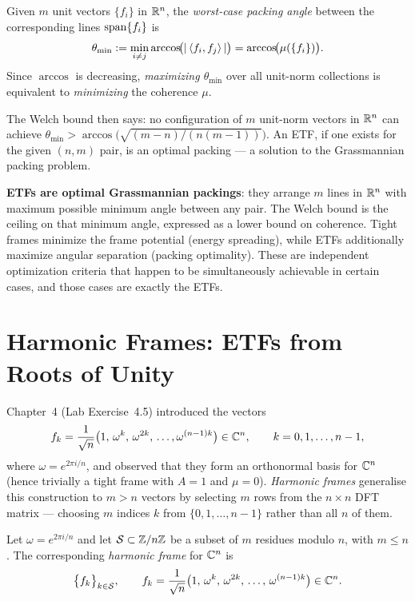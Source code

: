 \begin{definition}
\label{def:packing-angle}
Given $m$ unit vectors $\{f_i\}$ in $\mathbb{R}^n$, the \emph{worst-case
packing angle} between the corresponding lines $\operatorname{span}\{f_i\}$ is
\[
  \theta_{\min} :=
  \min_{i\ne j} \arccos\!\bigl(|\left\langle f_i, f_j \right\rangle|\bigr)
  = \arccos\!\bigl(\mu(\{f_i\})\bigr).
\]
Since $\arccos$ is decreasing, \emph{maximizing $\theta_{\min}$} over
all unit-norm collections is equivalent to \emph{minimizing} the
coherence $\mu$.
\end{definition}

The Welch bound then says: no configuration of $m$ unit-norm vectors in
$\mathbb{R}^n$ can achieve $\theta_{\min}>\arccos\!\bigl(\sqrt{(m-n)/(n(m-1))}\bigr)$.
An ETF, if one exists for the given $(n,m)$ pair, is an optimal packing
--- a solution to the Grassmannian packing problem.

\begin{keyidea}
\textbf{ETFs are optimal Grassmannian packings}: they arrange $m$ lines
in $\mathbb{R}^n$ with maximum possible minimum angle between any pair. The
Welch bound is the ceiling on that minimum angle, expressed as a lower
bound on coherence. Tight frames minimize the frame potential (energy
spreading), while ETFs additionally maximize angular separation (packing
optimality). These are independent optimization criteria that happen to
be simultaneously achievable in certain cases, and those cases are
exactly the ETFs.
\end{keyidea}

\section{Harmonic Frames: ETFs from Roots of Unity}
\label{sec:harmonic-frames}

Chapter~4 (Lab Exercise~4.5) introduced the vectors
\[
  f_k = \frac{1}{\sqrt{n}}\bigl(1,\,\omega^k,\,\omega^{2k},\,\ldots,
  \omega^{(n-1)k}\bigr)\in\mathbb{C}^n, \qquad k=0,1,\ldots,n-1,
\]
where $\omega=e^{2\pi i/n}$, and observed that they form an orthonormal
basis for $\mathbb{C}^n$ (hence trivially a tight frame with $A=1$ and $\mu=0$).
\emph{Harmonic frames} generalise this construction to $m>n$ vectors by
selecting $m$ rows from the $n\times n$ DFT matrix --- choosing
$m$ indices $k$ from $\{0,1,\ldots,n-1\}$ rather than all $n$ of them.

\begin{definition}
\label{def:harmonic-frame}
Let $\omega=e^{2\pi i/n}$ and let $\mathcal{S}\subset\mathbb{Z}/n\mathbb{Z}$ be a
subset of $m$ residues modulo $n$, with $m\le n$. The corresponding
\emph{harmonic frame} for $\mathbb{C}^n$ is
\[
  \bigl\{f_k\bigr\}_{k\in\mathcal S},\qquad
  f_k=\frac{1}{\sqrt{n}}
  \bigl(1,\,\omega^k,\,\omega^{2k},\,\ldots,\,\omega^{(n-1)k}\bigr)\in\mathbb{C}^n.
\]
\end{definition}

